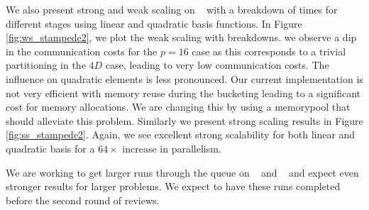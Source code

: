 We also present strong and weak scaling on \Stampede~ with a breakdown of times for different stages using linear and quadratic basis functions. In Figure \ref{fig:ws_stampede2}, we plot the weak scaling with breakdowns. we observe a dip in the communication costs for the $p=16$ case as this corresponds to a trivial partitioning in the $4D$ case, leading to very low communication costs. The influence on quadratic elements is less pronounced. Our current implementation is not very efficient with memory reuse during the bucketing leading to a significant cost for memory allocations. We are changing this by using a memorypool that should alleviate this problem. Similarly we present strong scaling results in Figure \ref{fig:ss_stampede2}. Again, we see excellent strong scalability for both linear and quadratic basis for a $64\times$ increase in parallelism. 

We are working to get larger runs through the queue on \Titan~ and \Stampede~ and expect even stronger results for larger problems. We expect to have these runs completed before the second round of reviews.